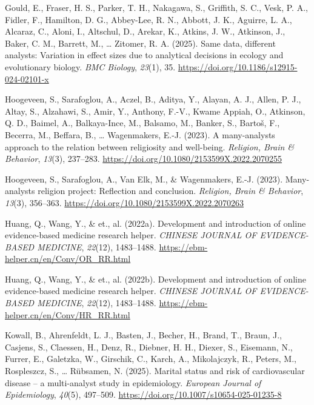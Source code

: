 \documentclass[
  man,
  floatsintext,
  longtable,
  nolmodern,
  notxfonts,
  notimes,
  colorlinks=true,linkcolor=blue,citecolor=blue,urlcolor=blue]{apa7}
\newlength{\cslhangindent}
\newenvironment{CSLReferences}[2] %
 {\begin{list}{}{%
  \setlength{\itemindent}{0pt}
  \setlength{\leftmargin}{0pt}
  \setlength{\parsep}{0pt}
  \ifodd #1
   \setlength{\leftmargin}{\cslhangindent}
   \setlength{\itemindent}{-1\cslhangindent}
  \fi
  \setlength{\itemsep}{#2\baselineskip}}}
 {\end{list}}
\begin{document}
\begin{CSLReferences}{1}{0}
Gould, E., Fraser, H. S., Parker, T. H., Nakagawa, S., Griffith, S. C.,
Vesk, P. A., Fidler, F., Hamilton, D. G., Abbey-Lee, R. N., Abbott, J.
K., Aguirre, L. A., Alcaraz, C., Aloni, I., Altschul, D., Arekar, K.,
Atkins, J. W., Atkinson, J., Baker, C. M., Barrett, M., \ldots{}
Zitomer, R. A. (2025). Same data, different analysts: Variation in
effect sizes due to analytical decisions in ecology and evolutionary
biology. \emph{BMC Biology}, \emph{23}(1), 35.
\url{https://doi.org/10.1186/s12915-024-02101-x}

Hoogeveen, S., Sarafoglou, A., Aczel, B., Aditya, Y., Alayan, A. J.,
Allen, P. J., Altay, S., Alzahawi, S., Amir, Y., Anthony, F.-V., Kwame
Appiah, O., Atkinson, Q. D., Baimel, A., Balkaya-Ince, M., Balsamo, M.,
Banker, S., Bartoš, F., Becerra, M., Beffara, B., \ldots{} Wagenmakers,
E.-J. (2023). A many-analysts approach to the relation between
religiosity and well-being. \emph{Religion, Brain \& Behavior},
\emph{13}(3), 237--283.
\url{https://doi.org/10.1080/2153599X.2022.2070255}

Hoogeveen, S., Sarafoglou, A., Van Elk, M., \& Wagenmakers, E.-J.
(2023). Many-analysts religion project: Reflection and conclusion.
\emph{Religion, Brain \& Behavior}, \emph{13}(3), 356--363.
\url{https://doi.org/10.1080/2153599X.2022.2070263}

Huang, Q., Wang, Y., \& et., al. (2022a). Development and introduction
of online evidence-based medicine research helper. \emph{CHINESE JOURNAL
OF EVIDENCE-BASED MEDICINE}, \emph{22}(12), 1483--1488.
\url{https://ebm-helper.cn/en/Conv/OR_RR.html}

Huang, Q., Wang, Y., \& et., al. (2022b). Development and introduction
of online evidence-based medicine research helper. \emph{CHINESE JOURNAL
OF EVIDENCE-BASED MEDICINE}, \emph{22}(12), 1483--1488.
\url{https://ebm-helper.cn/en/Conv/HR_RR.html}

Kowall, B., Ahrenfeldt, L. J., Basten, J., Becher, H., Brand, T., Braun,
J., Casjens, S., Claessen, H., Denz, R., Diebner, H. H., Diexer, S.,
Eisemann, N., Furrer, E., Galetzka, W., Girschik, C., Karch, A.,
Mikolajczyk, R., Peters, M., Rospleszcz, S., \ldots{} Rübsamen, N.
(2025). Marital status and risk of cardiovascular disease -- a
multi-analyst study in epidemiology. \emph{European Journal of
Epidemiology}, \emph{40}(5), 497--509.
\url{https://doi.org/10.1007/s10654-025-01235-8}


\end{CSLReferences}
\end{document}
